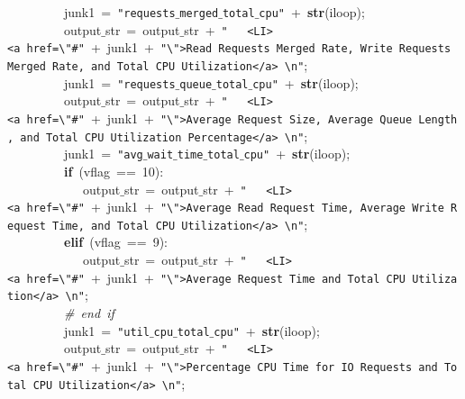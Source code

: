 \mbox{}\ \ \ \ \ \ \ \ \ junk1\ =\ \texttt{"{}requests$\_$merged$\_$total$\_$cpu"{}}\ +\ \textbf{str}(iloop); \\
\mbox{}\ \ \ \ \ \ \ \ \ output$\_$str\ =\ output$\_$str\ +\ \texttt{"{}\ \ \ \textless{}LI\textgreater{}\textless{}a\ href=\textbackslash{}"{}\#"{}}\ +\ junk1\ +\ \texttt{"{}\textbackslash{}"{}\textgreater{}Read\ Requests\ Merged\ Rate,\ Write\ Requests\ Merged\ Rate,\ and\ Total\ CPU\ Utilization\textless{}/a\textgreater{}\ \textbackslash{}n"{}}; \\
\mbox{}\ \ \ \ \ \ \ \ \ junk1\ =\ \texttt{"{}requests$\_$queue$\_$total$\_$cpu"{}}\ +\ \textbf{str}(iloop); \\
\mbox{}\ \ \ \ \ \ \ \ \ output$\_$str\ =\ output$\_$str\ +\ \texttt{"{}\ \ \ \textless{}LI\textgreater{}\textless{}a\ href=\textbackslash{}"{}\#"{}}\ +\ junk1\ +\ \texttt{"{}\textbackslash{}"{}\textgreater{}Average\ Request\ Size,\ Average\ Queue\ Length,\ and\ Total\ CPU\ Utilization\ Percentage\textless{}/a\textgreater{}\ \textbackslash{}n"{}}; \\
\mbox{}\ \ \ \ \ \ \ \ \ junk1\ =\ \texttt{"{}avg$\_$wait$\_$time$\_$total$\_$cpu"{}}\ +\ \textbf{str}(iloop); \\
\mbox{}\ \ \ \ \ \ \ \ \ \textbf{if}\ (vflag\ ==\ 10): \\
\mbox{}\ \ \ \ \ \ \ \ \ \ \ \ output$\_$str\ =\ output$\_$str\ +\ \texttt{"{}\ \ \ \textless{}LI\textgreater{}\textless{}a\ href=\textbackslash{}"{}\#"{}}\ +\ junk1\ +\ \texttt{"{}\textbackslash{}"{}\textgreater{}Average\ Read\ Request\ Time,\ Average\ Write\ Request\ Time,\ and\ Total\ CPU\ Utilization\textless{}/a\textgreater{}\ \textbackslash{}n"{}}; \\
\mbox{}\ \ \ \ \ \ \ \ \ \textbf{elif}\ (vflag\ ==\ 9): \\
\mbox{}\ \ \ \ \ \ \ \ \ \ \ \ output$\_$str\ =\ output$\_$str\ +\ \texttt{"{}\ \ \ \textless{}LI\textgreater{}\textless{}a\ href=\textbackslash{}"{}\#"{}}\ +\ junk1\ +\ \texttt{"{}\textbackslash{}"{}\textgreater{}Average\ Request\ Time\ and\ Total\ CPU\ Utilization\textless{}/a\textgreater{}\ \textbackslash{}n"{}}; \\
\mbox{}\ \ \ \ \ \ \ \ \ \textit{\#\ end\ if} \\
\mbox{}\ \ \ \ \ \ \ \ \ junk1\ =\ \texttt{"{}util$\_$cpu$\_$total$\_$cpu"{}}\ +\ \textbf{str}(iloop); \\
\mbox{}\ \ \ \ \ \ \ \ \ output$\_$str\ =\ output$\_$str\ +\ \texttt{"{}\ \ \ \textless{}LI\textgreater{}\textless{}a\ href=\textbackslash{}"{}\#"{}}\ +\ junk1\ +\ \texttt{"{}\textbackslash{}"{}\textgreater{}Percentage\ CPU\ Time\ for\ IO\ Requests\ and\ Total\ CPU\ Utilization\textless{}/a\textgreater{}\ \textbackslash{}n"{}}; \\
